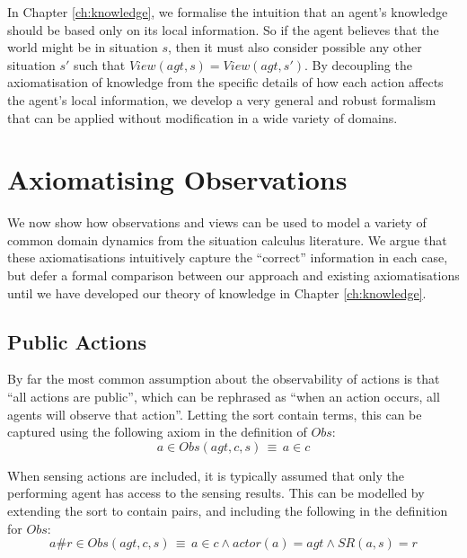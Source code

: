 In Chapter \ref{ch:knowledge}, we formalise the intuition that an
agent's knowledge should be based only on its local information. So
if the agent believes that the world might be in situation $s$, then
it must also consider possible any other situation $s'$ such that
$View(agt,s)=View(agt,s')$. By decoupling the axiomatisation of knowledge
from the specific details of how each action affects the agent's local
information, we develop a very general and robust formalism that can
be applied without modification in a wide variety of domains.


\section{Axiomatising Observations\label{sec:Observations:Axiomatising-simple}}

We now show how observations and views can be used to model a variety
of common domain dynamics from the situation calculus literature.
We argue that these axiomatisations intuitively capture the {}``correct''
information in each case, but defer a formal comparison between our
approach and existing axiomatisations until we have developed our
theory of knowledge in Chapter \ref{ch:knowledge}.


\subsection{Public Actions}

By far the most common assumption about the observability of actions
is that {}``all actions are public'', which can be rephrased as
{}``when an action occurs, all agents will observe that action''.
Letting the sort contain terms, this
can be captured using the following axiom in the definition of $Obs$:\begin{equation}
a\in Obs(agt,c,s)\,\equiv\, a\in c\label{eq:Observations:ObsStd1}\end{equation}


When sensing actions are included, it is typically assumed that only
the performing agent has access to the sensing results. This can be
modelled by extending the  sort to contain 
pairs, and including the following in the definition for $Obs$:\begin{equation}
a\#r\in Obs(agt,c,s)\,\equiv\, a\in c\wedge actor(a)=agt\wedge SR(a,s)=r\label{eq:Observations:ObsStd2}\end{equation}


